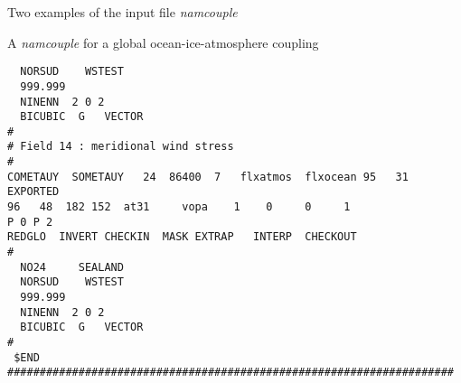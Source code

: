 \begin{section}{Two examples of the input file {\em namcouple}}
\begin{subsection}{A {\em namcouple} for a global ocean-ice-atmosphere coupling}
\begin{verbatim}
  NORSUD    WSTEST                                                        
  999.999                                                                 
  NINENN  2 0 2                                                               
  BICUBIC  G   VECTOR                                           
#                                                                       
# Field 14 : meridional wind stress                                     
#                                                                       
COMETAUY  SOMETAUY   24  86400  7   flxatmos  flxocean 95   31  EXPORTED
96   48  182 152  at31     vopa    1    0     0     1 
P 0 P 2                   
REDGLO  INVERT CHECKIN  MASK EXTRAP   INTERP  CHECKOUT                  
#                                                                       
  NO24     SEALAND                                                          
  NORSUD    WSTEST                                                        
  999.999                                                                 
  NINENN  2 0 2                                                              
  BICUBIC  G   VECTOR                                            
#                                                                       
 $END 
#####################################################################
\end{verbatim}       
\end{subsection}
\end{section}